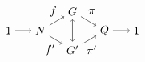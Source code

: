 \begin{equation}
    \begin{gathered}
        \begin{tikzpicture}
            \node (A) at (-2,0) {$1$};
            \node (B) at (-1,0) {$N$};
            \draw[->] (A) -- (B);
            \node (C) at (0, 0.6) {$G$};
            \node (D) at (0, -0.6) {$G'$};
            \draw [<->] (C) -- (D);
            \draw [->] (B) -- (C);
            \draw [->] (B) -- (D);
            \node (E) at (1, 0) {$Q$};
            \draw [->] (C) -- (E);
            \draw [->] (D) -- (E);
            \node (F) at (2, 0) {$1$};
            \draw [->] (E) -- (F);
            \node at (-0.6, 0.6) {$f$};
            \node at (-0.7, -0.6) {$f'$};
            \node at (0.6, 0.6) {$\pi$};
            \node at (0.6, -0.6) {$\pi'$};
        \end{tikzpicture}
    \end{gathered}
    \label{eq:equivalent-commuting-diagram}
\end{equation}